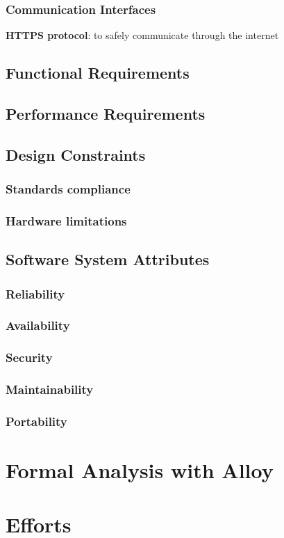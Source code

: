 \documentclass{article}
\begin{document}
\subsubsection {Communication Interfaces}
\textbf{HTTPS protocol}: to safely communicate through the internet
\subsection{Functional Requirements}

\subsection{Performance Requirements}

\subsection{Design Constraints}
\subsubsection{Standards compliance}
\subsubsection{Hardware limitations}

\subsection{Software System Attributes}
\subsubsection{Reliability}
\subsubsection{Availability}
\subsubsection{Security}
\subsubsection{Maintainability}
\subsubsection{Portability}

\section{Formal Analysis with Alloy}

\section{Efforts}




    
\end{document}
